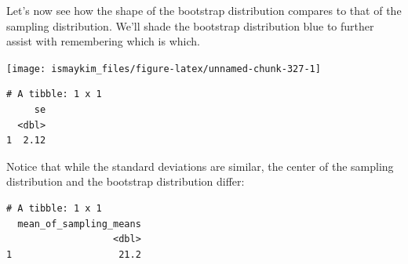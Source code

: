 \documentclass[12pt,]{krantz}
\makeatletter
\newenvironment{Shaded}{\begin{snugshade}}{\end{snugshade}}
\newcommand{\KeywordTok}[1]{\textcolor[rgb]{0.27,0.27,0.27}{\textbf{#1}}}
\newcommand{\DataTypeTok}[1]{\textcolor[rgb]{0.27,0.27,0.27}{#1}}
\newcommand{\DecValTok}[1]{\textcolor[rgb]{0.06,0.06,0.06}{#1}}
\newcommand{\StringTok}[1]{\textcolor[rgb]{0.5,0.5,0.5}{#1}}
\newcommand{\OperatorTok}[1]{\textcolor[rgb]{0.43,0.43,0.43}{\textbf{#1}}}
\newcommand{\NormalTok}[1]{#1}
\newenvironment{kframe}{%
\medskip{}
\setlength{\fboxsep}{.8em}
 \def\at@end@of@kframe{}%
 \ifinner\ifhmode%
  \def\at@end@of@kframe{\end{minipage}}%
  \begin{minipage}{\columnwidth}%
 \fi\fi%
 \def\FrameCommand##1{\hskip\@totalleftmargin \hskip-\fboxsep
 \colorbox{shadecolor}{##1}\hskip-\fboxsep
     \hskip-\linewidth \hskip-\@totalleftmargin \hskip\columnwidth}%
 \MakeFramed {\advance\hsize-\width
   \@totalleftmargin\z@ \linewidth\hsize
   \@setminipage}}%
 {\par\unskip\endMakeFramed%
 \at@end@of@kframe}
\renewenvironment{Shaded}{\begin{kframe}}{\end{kframe}}
\theoremstyle{definition}
\theoremstyle{definition}
\theoremstyle{definition}
\theoremstyle{remark}
\makeatother
\begin{document}
Let's now see how the shape of the bootstrap distribution compares to
that of the sampling distribution. We'll shade the bootstrap
distribution blue to further assist with remembering which is which.

\begin{Shaded}
\end{Shaded}

\begin{center}\texttt{[image: ismaykim\_files/figure-latex/unnamed-chunk-327-1]} \end{center}

\begin{Shaded}
\end{Shaded}

\begin{verbatim}
# A tibble: 1 x 1
     se
  <dbl>
1  2.12
\end{verbatim}

Notice that while the standard deviations are similar, the center of the
sampling distribution and the bootstrap distribution differ:

\begin{Shaded}
\end{Shaded}

\begin{verbatim}
# A tibble: 1 x 1
  mean_of_sampling_means
                   <dbl>
1                   21.2
\end{verbatim}

\begin{Shaded}
\end{Shaded}
\end{document}
